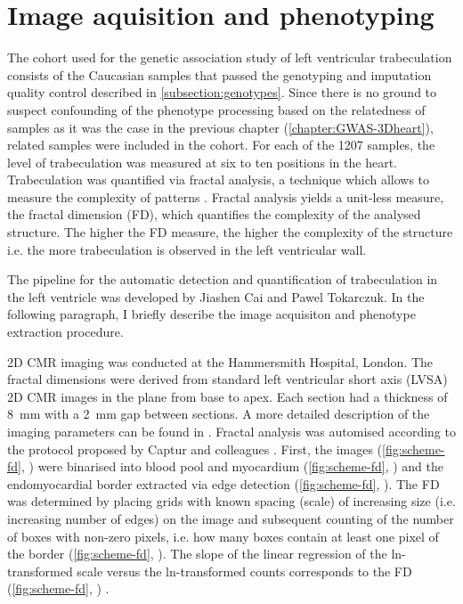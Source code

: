 \section{Image aquisition and phenotyping}
The cohort used for the genetic association study of left ventricular trabeculation consists of the Caucasian samples that passed the genotyping and imputation quality control described in \cref{subsection:genotypes}. Since there is no ground to suspect confounding of the phenotype processing based on the relatedness of samples as it was the case in the previous chapter (\cref{chapter:GWAS-3Dheart}), related samples were included in the cohort. For each of the \num{1207} samples, the level of trabeculation was measured at six to ten positions in the heart. Trabeculation was quantified via fractal analysis, a technique which allows to measure the complexity of patterns \citep{Eke2002}. Fractal analysis yields a unit-less measure, the fractal dimension (FD), which quantifies the complexity of the analysed structure. The higher the FD measure, the higher the complexity of the structure i.e. the more trabeculation is observed in the left ventricular wall. 

The pipeline for the automatic detection and quantification of trabeculation in the left ventricle was developed by Jiashen Cai and Pawel Tokarczuk. In the following paragraph, I briefly describe the image acquisiton and phenotype extraction procedure. 

2D CMR imaging was conducted at the Hammersmith Hospital, London. The fractal dimensions were derived from standard left ventricular short axis (LVSA) 2D CMR images in the plane from base to apex. Each section had a thickness of \num{8}~mm with a \num{2}~mm gap between sections. A more detailed description of the imaging parameters can be found in \citep{deMarvao2014}. Fractal analysis was automised according to the protocol proposed by Captur and colleagues \citeyearpar{Captur2013}. First, the images (\cref{fig:scheme-fd}, ) were binarised into blood pool and myocardium (\cref{fig:scheme-fd}, ) and the endomyocardial border extracted via edge detection (\cref{fig:scheme-fd}, ). The FD was determined by placing grids with known spacing (scale) of increasing size (i.e. increasing number of edges) on the image and subsequent counting of the number of boxes with non-zero pixels, i.e. how many boxes contain at least one pixel of the border (\cref{fig:scheme-fd}, ). The slope of the linear regression of the ln-transformed scale versus the ln-transformed counts corresponds to the FD (\cref{fig:scheme-fd}, ) \citep{Captur2013}.

